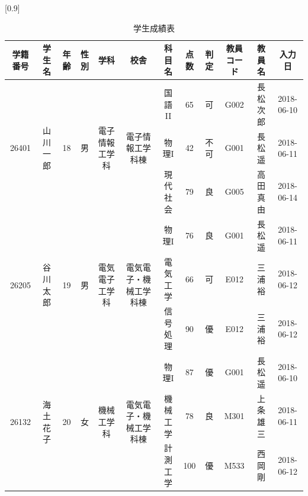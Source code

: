 \documentclass[a4j]{jarticle}
\begin{document}
      \begin{table}[H]
        \caption{学生成績表}
        \label{kadai1}
        \begin{center}
          \scalebox{0.7}[0.9]{
          \begin{tabular}{c|c|c|c|c|c|c|c|c|c|c|c}\hline
            学籍番号 & 学生名 & 年齢 &性別 & 学科 & 校舎 & 科目名 & 点数 & 判定 & 教員コード & 教員名 & 入力日 \\ \hline \hline
            \multirow{3}{*}{26401} & \multirow{3}{*}{山川 一郎} & \multirow{3}{*}{18} & \multirow{3}{*}{男} & \multirow{3}{*}{電子情報工学科} & \multirow{3}{*}{電子情報工学科棟}
            & 国語II & 65 & 可 & G002 & 長松次郎 & 2018-06-10 \\ \cline{7-12}
             & & & & & & 物理I & 42 & 不可 & G001 & 長松 遥 & 2018-06-11 \\ \cline{7-12}
             & & & & & & 現代社会 & 79 & 良 & G005 & 高田 真由 & 2018-06-14 \\ \hline
             \multirow{3}{*}{26205} & \multirow{3}{*}{谷川 太郎} & \multirow{3}{*}{19} & \multirow{3}{*}{男} & \multirow{3}{*}{電気電子工学科} & \multirow{3}{*}{電気電子・機械工学科棟}
             & 物理I & 76 & 良 & G001 & 長松 遥 & 2018-06-11 \\ \cline{7-12}
              & & & & & & 電気工学 & 66 & 可 & E012 & 三浦 裕 & 2018-06-12 \\ \cline{7-12}
              & & & & & & 信号処理 & 90 & 優 & E012 & 三浦 裕 & 2018-06-12 \\ \hline
            \multirow{3}{*}{26132} & \multirow{3}{*}{海土 花子} & \multirow{3}{*}{20} & \multirow{3}{*}{女} & \multirow{3}{*}{機械工学科} & \multirow{3}{*}{電気電子・機械工学科棟}
             & 物理I & 87 & 優 & G001 & 長松 遥 & 2018-06-10 \\ \cline{7-12}
              & & & & & & 機械工学 & 78 & 良 & M301 & 上条 雄三 & 2018-06-11 \\ \cline{7-12}
              & & & & & & 計測工学 & 100 & 優 & M533 & 西岡 剛 & 2018-06-12 \\ \hline  
           \end{tabular}
          }
        \end{center}
        \end{table}
\end{document}
